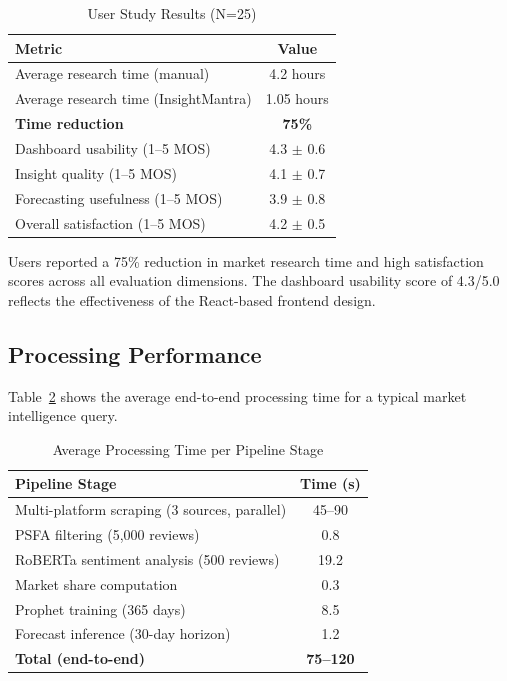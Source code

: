\documentclass[conference]{IEEEtran}
\begin{document}
\begin{table}[htbp]
\caption{User Study Results (N=25)}
\begin{center}
\begin{tabular}{lc}
\toprule
\textbf{Metric} & \textbf{Value} \\
\midrule
Average research time (manual) & 4.2 hours \\
Average research time (InsightMantra) & 1.05 hours \\
\textbf{Time reduction} & \textbf{75\%} \\
Dashboard usability (1--5 MOS) & 4.3 $\pm$ 0.6 \\
Insight quality (1--5 MOS) & 4.1 $\pm$ 0.7 \\
Forecasting usefulness (1--5 MOS) & 3.9 $\pm$ 0.8 \\
Overall satisfaction (1--5 MOS) & 4.2 $\pm$ 0.5 \\
\bottomrule
\end{tabular}
\label{tab:user_study}
\end{center}
\end{table}

Users reported a 75\% reduction in market research time and high satisfaction scores across all evaluation dimensions. The dashboard usability score of 4.3/5.0 reflects the effectiveness of the React-based frontend design.

\subsection{Processing Performance}

Table~\ref{tab:timing} shows the average end-to-end processing time for a typical market intelligence query.

\begin{table}[htbp]
\caption{Average Processing Time per Pipeline Stage}
\begin{center}
\begin{tabular}{lc}
\toprule
\textbf{Pipeline Stage} & \textbf{Time (s)} \\
\midrule
Multi-platform scraping (3 sources, parallel) & 45--90 \\
PSFA filtering (5,000 reviews) & 0.8 \\
RoBERTa sentiment analysis (500 reviews) & 19.2 \\
Market share computation & 0.3 \\
Prophet training (365 days) & 8.5 \\
Forecast inference (30-day horizon) & 1.2 \\
\midrule
\textbf{Total (end-to-end)} & \textbf{75--120} \\
\bottomrule
\end{tabular}
\label{tab:timing}
\end{center}
\end{table}
\end{document}
